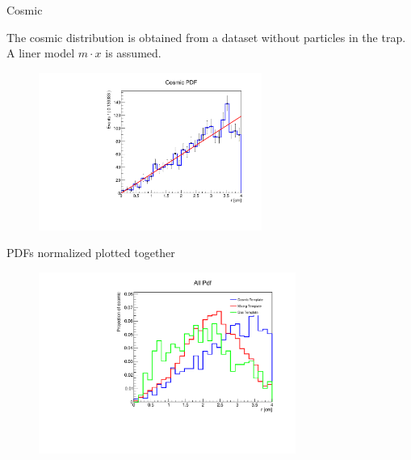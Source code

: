 \documentclass[9pt]{beamer}
\begin{document}
\begin{frame}{Cosmic}

The cosmic distribution is obtained from a dataset without particles in the trap. A liner model $m \cdot x$ is assumed.

\begin{figure}
\includegraphics[width = 0.65\textwidth]{./SingleModel/Cosmici_fit.pdf}
\end{figure}

\end{frame}

\begin{frame}{PDFs normalized plotted together}
\begin{figure}
\includegraphics[width = 0.75\textwidth]{PdfTogether.pdf}
\end{figure}
\end{frame}
\end{document}
